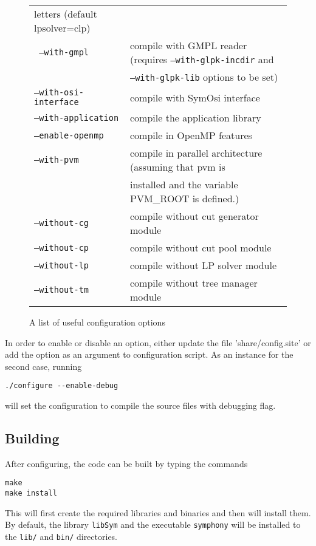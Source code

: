 \begin{figure}[htb]
\begin{tabular}{ll}
letters (default lpsolver=clp) \\
\texttt{ --with-gmpl} &  compile with GMPL reader (requires 
\texttt{--with-glpk-incdir} and \\ &
\texttt{--with-glpk-lib} options to be set) \\
\texttt{--with-osi-interface} &  compile with SymOsi interface \\
\texttt{--with-application} &  compile the application library \\
\hline
\texttt{--enable-openmp} &   compile in OpenMP features \\
\texttt{--with-pvm } &  compile in parallel architecture (assuming that pvm is \\ 
&installed and the variable PVM\_ROOT is defined.) \\
\texttt{--without-cg} &  compile without cut generator module \\
\texttt{--without-cp} &  compile without cut pool module \\
\texttt{--without-lp} &  compile without LP solver module \\
\texttt{--without-tm} &  compile without tree manager module
\end{tabular}
\caption{A list of useful configuration options \label{conf_opts}}
\end{figure}

In order to enable or disable an option, either update the file 
'share/config.site' or add the option as an argument to configuration script. 
As an instance for the second case, running 
{\color{Brown}
\begin{verbatim}
./configure --enable-debug
\end{verbatim}
}
will set the configuration to compile the source files with debugging
flag. 

\subsection{Building}\label{building}

After configuring, the code can be built by typing the commands
{\color{Brown}
\begin{verbatim}
make
make install
\end{verbatim}
}
This will first create the required libraries and binaries and then will
install them. By default, the library \texttt{libSym} and the executable
\texttt{symphony} will be installed to the \texttt{lib/} and \texttt{bin/}
directories.

